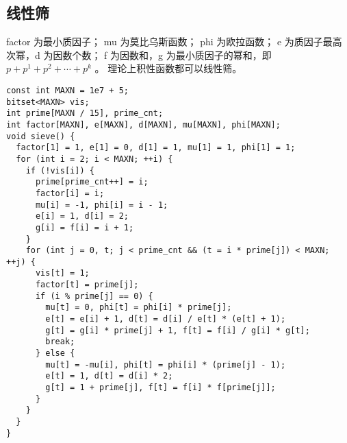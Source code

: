 \subsection{线性筛}
factor 为最小质因子；
mu 为莫比乌斯函数；
phi 为欧拉函数；
e 为质因子最高次幂，d 为因数个数；
f 为因数和，g 为最小质因子的幂和，即 $p + p^{1} + p^{2} + \cdots + p^{k}$ 。
理论上积性函数都可以线性筛。

\begin{lstlisting}
const int MAXN = 1e7 + 5;
bitset<MAXN> vis;
int prime[MAXN / 15], prime_cnt;
int factor[MAXN], e[MAXN], d[MAXN], mu[MAXN], phi[MAXN];
void sieve() {
  factor[1] = 1, e[1] = 0, d[1] = 1, mu[1] = 1, phi[1] = 1;
  for (int i = 2; i < MAXN; ++i) {
    if (!vis[i]) {
      prime[prime_cnt++] = i;
      factor[i] = i;
      mu[i] = -1, phi[i] = i - 1;
      e[i] = 1, d[i] = 2;
      g[i] = f[i] = i + 1;
    }
    for (int j = 0, t; j < prime_cnt && (t = i * prime[j]) < MAXN; ++j) {
      vis[t] = 1;
      factor[t] = prime[j];
      if (i % prime[j] == 0) {
        mu[t] = 0, phi[t] = phi[i] * prime[j];
        e[t] = e[i] + 1, d[t] = d[i] / e[t] * (e[t] + 1);
        g[t] = g[i] * prime[j] + 1, f[t] = f[i] / g[i] * g[t];
        break;
      } else {
        mu[t] = -mu[i], phi[t] = phi[i] * (prime[j] - 1);
        e[t] = 1, d[t] = d[i] * 2;
        g[t] = 1 + prime[j], f[t] = f[i] * f[prime[j]];
      }
    }
  }
}
\end{lstlisting}